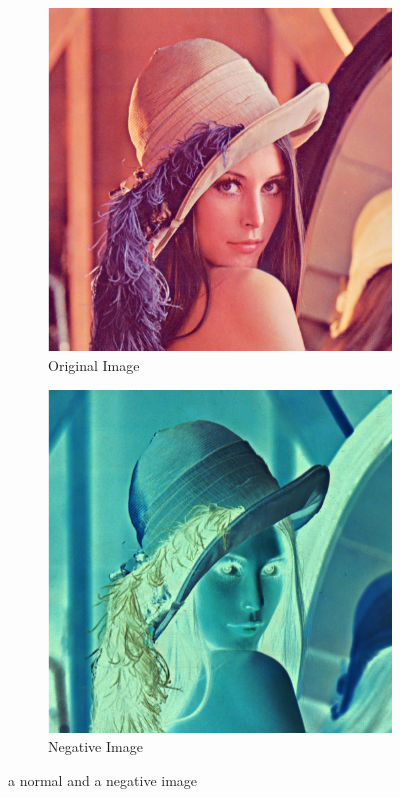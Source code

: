 \documentclass[a4paper,16pt]{article}
\begin{document}
	\begin{figure}[h!]
		\begin{subfigure}[h]{0.4\linewidth}
			\includegraphics[width=\linewidth]{original}
			\caption{Original Image}
		\end{subfigure}
		\hfill
		\begin{subfigure}[h]{0.4\linewidth}
			\includegraphics[width=\linewidth]{negative}
			\caption{Negative Image}
		\end{subfigure}%
		\caption{a normal and a negative image}
	\end{figure}
	\newpage
\end{document}
